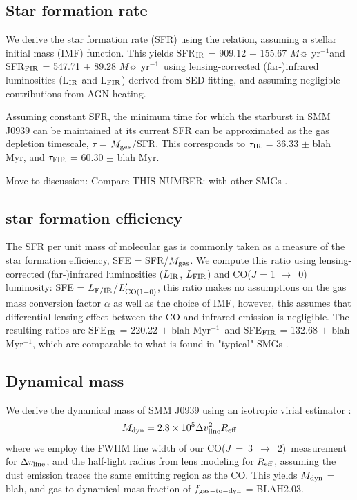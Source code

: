 \documentclass[twocolumn,apj,numberedappendix]{emulateapj}
\newcommand{\rarr}{$\rightarrow$}
\newcommand{\CO}{\mbox{CO($J$ = 3 $\rightarrow$ 2) }}
\newcommand{\Lp}{\mbox{$L^{\prime}_{\rm CO(1-0)}$}}
\newcommand{\eg}{{\sl e.g.,~}}
\newcommand{\pmOne}{$^{-1}$}
\begin{document}
\subsection{Star formation rate}
We derive the star formation rate (SFR) using the \citet{Kennicutt98a} relation, assuming a \citet{Chabrier03a}
stellar initial mass (IMF) function. This yields SFR$_{\rm IR}$ 
= 909.12 $\pm$ 155.67 $M\sun$ yr\pmOne and SFR$_{\rm FIR}$ = 547.71 $\pm$ 89.28 $M
\sun$ yr\pmOne\ using lensing-corrected (far-)infrared luminosities (L$_{\rm IR}$ and L$_{\rm FIR}$) derived from SED 
fitting, and assuming negligible contributions from AGN heating.

Assuming constant SFR, the minimum time for which the starburst in SMM J0939 can be maintained at its
current SFR can be approximated as the gas depletion timescale, $\tau$ = $M_{\rm gas}$/SFR. 
This corresponds to $\tau_{\rm IR}$ = 36.33 $\pm$ blah Myr, and $\tau_{\rm FIR}$ = 60.30 $\pm$ blah Myr.

Move to discussion: Compare THIS NUMBER: with other SMGs \citep[\eg][]{Greve05a}. 

\subsection{star formation efficiency}
The SFR per unit mass of molecular gas is commonly taken as a
measure of the star formation efficiency, SFE = SFR/$M_{\rm gas}$. We compute this ratio using lensing-corrected (far-)infrared 
luminosities ($L_{\rm IR}$, $L_{\rm FIR}$) and CO($J$ = 1 \rarr\ 0) luminosity: SFE = $L_{\rm F/IR}$/\Lp, this ratio makes no assumptions on the gas mass conversion factor $\alpha$ as well as the 
choice of IMF, however, this assumes that differential lensing effect between the CO and infrared emission is negligible. 
The resulting ratios are SFE$_{\rm IR}$ = 220.22 $\pm$ blah Myr\pmOne\ and SFE$_{\rm FIR}$ = 132.68 $\pm$ blah Myr\pmOne, which are comparable
to what is found in "typical" SMGs \citep{Riechers10, Tacconi06, Greve05a}.

\subsection{Dynamical mass} 
We derive the dynamical mass of SMM J0939 using an isotropic virial estimator \citep[\eg][]{Engel10a}:
\begin{equation}
M_{\rm dyn} = 2.8\times 10^5\Delta v_{\rm line}^ 2 R_{\rm eff}
\end{equation}
where we employ the FWHM line width of our \CO measurement for $\Delta v_{\rm line}$,
and the half-light radius from lens modeling for $R_{\rm eff}$, assuming the dust emission traces the same emitting region as the CO. This yields $M_{\rm dyn}$ = blah, and gas-to-dynamical mass fraction of $f_{\rm gas-to-dyn}$ = BLAH2.03.
\end{document}
